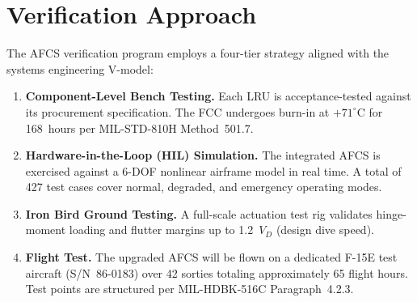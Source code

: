 \section{Verification Approach}
The AFCS verification program employs a four-tier strategy aligned with the
systems engineering V-model:

\begin{enumerate}[label=\textbf{Tier \arabic*:}, leftmargin=*]
  \item \textbf{Component-Level Bench Testing.} Each LRU is acceptance-tested
    against its procurement specification. The FCC undergoes burn-in at
    $+71^\circ$C for 168~hours per MIL-STD-810H Method~501.7.
  \item \textbf{Hardware-in-the-Loop (HIL) Simulation.} The integrated AFCS
    is exercised against a 6-DOF nonlinear airframe model in real time.
    A total of 427 test cases cover normal, degraded, and emergency operating
    modes.
  \item \textbf{Iron Bird Ground Testing.} A full-scale actuation test rig
    validates hinge-moment loading and flutter margins up to 1.2~$V_D$ (design
    dive speed).
  \item \textbf{Flight Test.} The upgraded AFCS will be flown on a dedicated
    F-15E test aircraft (S/N~86-0183) over 42 sorties totaling approximately
    65 flight hours. Test points are structured per
    MIL-HDBK-516C Paragraph~4.2.3.
\end{enumerate}
